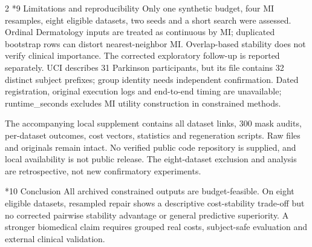 \documentclass[10pt,a4paper]{article}
\makeatletter
\renewcommand{\section}{\@startsection{section}{1}{0pt}{5pt}{2pt}{\normalfont\normalsize\bfseries}}
\newcommand{\sect}[1]{\section*{#1}}
\makeatother
\begin{document}
\begin{multicols}{2}
\sect{9  Limitations and reproducibility}
Only one synthetic budget, four MI resamples, eight eligible datasets, two seeds and a short search were assessed. Ordinal Dermatology inputs are treated as continuous by MI; duplicated bootstrap rows can distort nearest-neighbor MI. Overlap-based stability does not verify clinical importance. The corrected exploratory follow-up is reported separately. UCI describes 31 Parkinson participants, but its file contains 32 distinct subject prefixes; group identity needs independent confirmation. Dated registration, original execution logs and end-to-end timing are unavailable; runtime\_seconds excludes MI utility construction in constrained methods.

The accompanying local supplement contains all dataset links, 300 mask audits, per-dataset outcomes, cost vectors, statistics and regeneration scripts. Raw files and originals remain intact. No verified public code repository is supplied, and local availability is not public release. The eight-dataset exclusion and analysis are retrospective, not new confirmatory experiments.

\sect{10  Conclusion}
All archived constrained outputs are budget-feasible. On eight eligible datasets, resampled repair shows a descriptive cost-stability trade-off but no corrected pairwise stability advantage or general predictive superiority. A stronger biomedical claim requires grouped real costs, subject-safe evaluation and external clinical validation.


\end{multicols}
\end{document}
